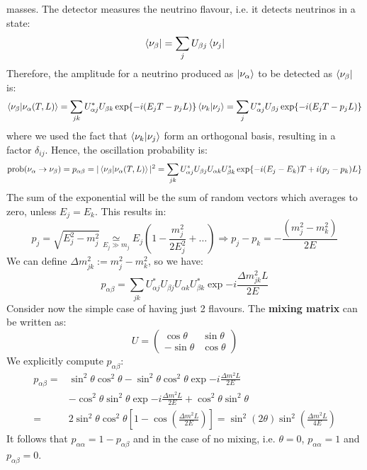 \documentclass[10.75pt,a4paper,openright,bottom=2cm]{article}
\begin{document}
masses. The detector measures the neutrino flavour, i.e. it detects neutrinos in a state:
\[
\bra{\nu_\beta}=\sum_jU_{\beta j}\bra{\nu_j}
\]
Therefore, the amplitude for a neutrino produced as $\ket{\nu_\alpha}$ to be detected as $\bra{\nu_\beta}$ is:
\[
\braket{\nu_\beta}{\nu_\alpha(T,L)}=\sum_{jk}U_{\alpha j}^*U_{\beta k}\exp{-i(E_jT-p_jL)}\braket{\nu_k}{\nu_j}=\sum_jU_{\alpha j}^*U_{\beta j}\exp{-i(E_jT-p_jL)}
\]
where we used the fact that $\braket{\nu_k}{\nu_j}$ form an orthogonal basis, resulting in a factor $\delta_{ij}$. Hence, the oscillation probability is:
\[
\text{prob}(\nu_\alpha\to\nu_\beta)=p_{\alpha\beta}=|\braket{\nu_\beta}{\nu_\alpha(T,L)}|^2=\sum_{jk}U_{\alpha j}^*U_{\beta j}U_{\alpha k}U_{\beta k}^*\exp{-i(E_j-E_k)T+i(p_j-p_k)L}
\]
The sum of the exponential will be the sum of random vectors which averages to zero, unless $E_j=E_k$. This results in:
\[
p_j=\sqrt{E_j^2-m_j^2}\underset{E_j\gg m_j}{\simeq}E_j\left(1-\frac{m_j^2}{2E_j^2}+\dots\right)\Rightarrow p_j-p_k=-\frac{(m_j^2-m_k^2)}{2E}
\]
We can define $\Delta m_{jk}^2:=m_j^2-m_k^2$, so we have:
\[
p_{\alpha\beta}=\sum_{jk}U_{\alpha j}^*U_{\beta j}U_{\alpha k}U_{\beta k}^*\exp{-i\frac{\Delta m_{jk}^2L}{2E}}
\]
Consider now the simple case of having just 2 flavours. The \textbf{mixing matrix} can be written as:
\[
U=\left(\begin{array}{cc}
    \cos\theta & \sin\theta \\
    -\sin\theta & \cos\theta
\end{array}\right)
\]
We explicitly compute $p_{\alpha\beta}$:
\begin{align*}
p_{\alpha\beta}=&\sin^2\theta\cos^2\theta-\sin^2\theta\cos^2\theta\exp{-i\frac{\Delta m^2L}{2E}}\\
&-\cos^2\theta\sin^2\theta\exp{-i\frac{\Delta m^2L}{2E}}+\cos^2\theta\sin^2\theta\\
=&2\sin^2\theta\cos^2\theta\left[1-\cos\left(\frac{\Delta m^2L}{2E}\right)\right]=\sin^2(2\theta)\sin^2\left(\frac{\Delta m^2L}{4E}\right)
\end{align*}
It follows that $p_{\alpha\alpha}=1-p_{\alpha\beta}$ and in the case of no mixing, i.e. $\theta=0$, $p_{\alpha\alpha}=1$ and $p_{\alpha\beta}=0$.
\end{document}
